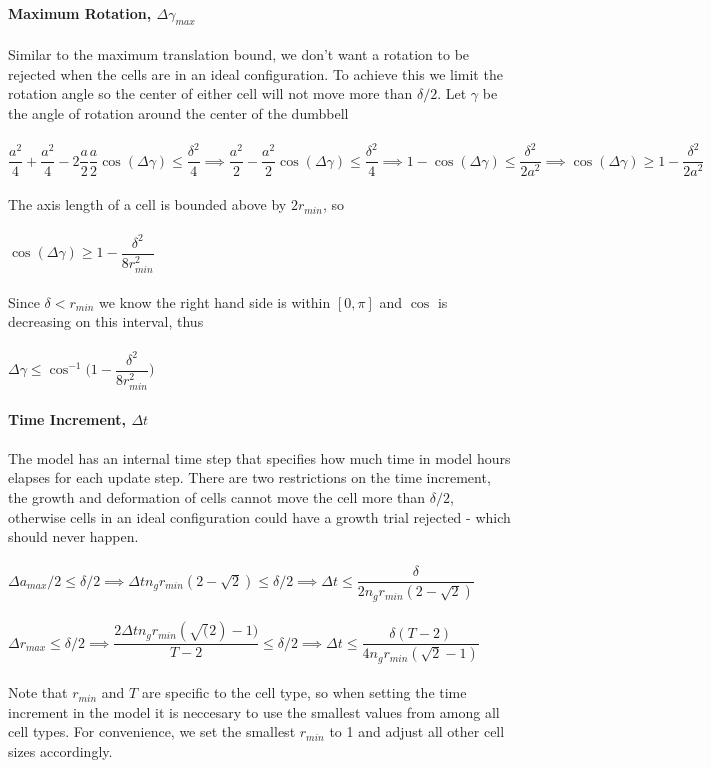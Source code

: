 \documentclass{article}
\begin{document}
\\
\textbf{Maximum Rotation, $\Delta \gamma_{max}$}\\
\\
Similar to the maximum translation bound, we don't want a rotation to be rejected when the cells are in an ideal configuration. To achieve this we limit the rotation angle so the center of either cell will not move more than $\delta/2$. Let $\gamma$ be the angle of rotation around the center of the dumbbell\\
\\
$\dfrac{a^2}{4}  + \dfrac{a^2}{4} - 2\dfrac{a}{2}\dfrac{a}{2}\cos(\Delta\gamma) \le \dfrac{\delta^2}{4} \implies \dfrac{a^2}{2} - \dfrac{a^2}{2}\cos(\Delta\gamma) \le \dfrac{\delta^2}{4} \implies 1 - \cos(\Delta\gamma) \le \dfrac{\delta^2}{2a^2} \implies \cos(\Delta\gamma) \ge 1 - \dfrac{\delta^2}{2a^2}$\\
\\
The axis length of a cell is bounded above by $2 r_{min}$, so\\
\\
$\cos(\Delta\gamma) \ge 1 - \dfrac{\delta^2}{8r_{min}^2}$\\
\\
Since $\delta < r_{min}$ we know the right hand side is within $[0,\pi]$ and $\cos$ is decreasing on this interval, thus\\
\\
$\Delta\gamma \le \cos^{-1}\biggr(1 - \dfrac{\delta^2}{8r^2_{min}}\biggr)$\\
\\
\textbf{Time Increment, $\Delta t$}\\
\\
The model has an internal time step that specifies how much time in model hours elapses for each update step. There are two restrictions on the time increment, the growth and deformation of cells cannot move the cell more than $\delta / 2$, otherwise cells in an ideal configuration could have a growth trial rejected - which should never happen.\\
\\
$\Delta a_{max} / 2 \le \delta / 2 \implies \Delta t n_g r_{min}(2 - \sqrt{2}) \le \delta / 2 \implies \Delta t \le \dfrac{\delta}{2 n_g r_{min}(2 - \sqrt{2})}$\\
\\
$\Delta r_{max} \le \delta / 2 \implies \dfrac{2\Delta t n_g r_{min}(\sqrt(2) - 1)}{T - 2} \le \delta / 2 \implies \Delta t \le \dfrac{\delta(T - 2)}{4 n_g r_{min}(\sqrt{2} - 1)}$\\
\\
Note that $r_{min}$ and $T$ are specific to the cell type, so when setting the time increment in the model it is neccesary to use the smallest values from among all cell types. For convenience, we set the smallest $r_{min}$ to 1 and adjust all other cell sizes accordingly.\\
\\
\end{document}
